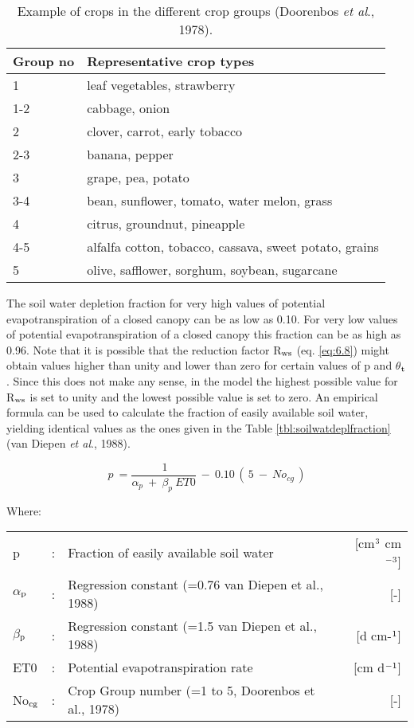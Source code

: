 \begin{table}
	\caption{Example of crops in the different crop groups (Doorenbos {\it et al}., 1978).}
	\label{tbl:ExampleCropGroups}
	\begin{tabularx}{\textwidth}{lX}
		\hline
		Group no & Representative crop types\\
		\hline
		1 & leaf vegetables, strawberry\\     
		1-2 & cabbage, onion\\
		2 & clover, carrot, early tobacco\\     
		2-3 & banana, pepper\\
		3 & grape, pea, potato\\
		3-4 & bean, sunflower, tomato, water melon, grass\\
		4 & citrus, groundnut, pineapple\\
		4-5 & alfalfa cotton, tobacco, cassava, sweet potato, grains\\
		5 & olive, safflower, sorghum, soybean, sugarcane\\
		\hline
	\end{tabularx}
\end{table}

The soil water depletion fraction for very high values of potential evapotranspiration of a
closed canopy can be as low as 0.10. For very low values of potential evapotranspiration
of a closed canopy this fraction can be as high as 0.96.
Note that it is possible that the reduction factor R$_{{\rm ws}}$ (eq. \ref{eq:6.8}) might obtain 
values higher
than unity and lower than zero for certain values of p and $\theta$$_{{\rm t}}$. Since this does not make
any sense, in the model the highest possible value for R$_{{\rm ws}}$ is set to unity and the lowest
possible value is set to zero.
An empirical formula can be used to calculate the fraction of easily available soil water,
yielding identical values as the ones given in the Table \ref{tbl:soilwatdeplfraction} 
(van Diepen {\it et al}., 1988).

\begin{equation}
\label{eq:6.10}
p~={\frac{~1}{ \alpha _{p} ~+~ \beta _{p} ~ET0}} ~-~ 0.10\, (\, 5~-~No _{cg} \, )
\end{equation}

Where:\\[5pt]
\begin{tabularx}{\textwidth}{llXr}
	p &:& Fraction of easily available soil water  & [cm$^{{\rm 3}}$ cm$^{{\rm -3}}$]\\
	$\alpha$$_{{\rm p}}$ &:& Regression constant {\small (=0.76 van Diepen et al., 1988)}  & [-]\\
	$\beta$$_{{\rm p}}$ &:& Regression constant {\small (=1.5 van Diepen et al., 1988)}  & [d cm-$^{{\rm 1}}$]\\
	ET0 &:& Potential evapotranspiration rate  & [cm d$^{{\rm -1}}$]\\
	No$_{{\rm cg}}$ &:& Crop Group number {\small (=1 to 5, Doorenbos et al., 1978)}  & [-]\\
\end{tabularx}

